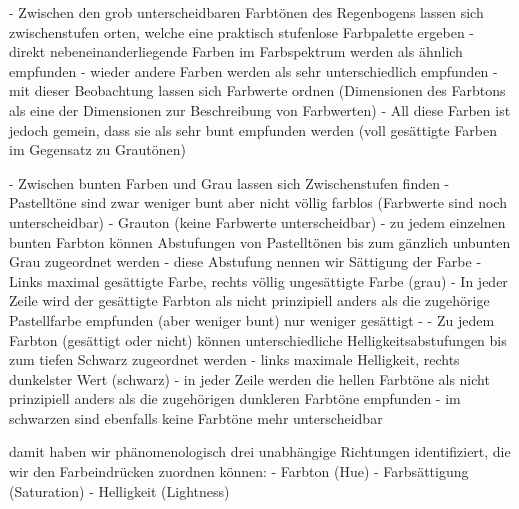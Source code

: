 \documentclass[10pt,landscape]{article}
\begin{document}
\begin{multicols}{3}
- Zwischen den grob unterscheidbaren Farbtönen des Regenbogens lassen sich zwischenstufen orten, welche eine praktisch stufenlose Farbpalette ergeben
- direkt nebeneinanderliegende Farben im Farbspektrum werden als ähnlich empfunden 
- wieder andere Farben werden als sehr unterschiedlich empfunden
- mit dieser Beobachtung lassen sich Farbwerte ordnen (Dimensionen des Farbtons als eine der Dimensionen zur Beschreibung von Farbwerten)
- All diese Farben ist jedoch gemein, dass sie als sehr bunt empfunden werden (voll gesättigte Farben im Gegensatz zu Grautönen)

- Zwischen bunten Farben und Grau lassen sich Zwischenstufen finden
- Pastelltöne sind zwar weniger bunt aber nicht völlig farblos (Farbwerte sind noch unterscheidbar)
- Grauton (keine Farbwerte unterscheidbar)
- zu jedem einzelnen bunten Farbton können Abstufungen von Pastelltönen bis zum gänzlich unbunten Grau zugeordnet werden
  - diese Abstufung nennen wir Sättigung der Farbe
  - Links maximal gesättigte Farbe, rechts völlig ungesättigte Farbe (grau)
- In jeder Zeile wird der gesättigte Farbton als nicht prinzipiell anders als die zugehörige Pastellfarbe empfunden (aber weniger bunt) nur weniger gesättigt
- 
- Zu jedem Farbton (gesättigt oder nicht) können unterschiedliche Helligkeitsabstufungen bis zum tiefen Schwarz zugeordnet werden
  - links maximale Helligkeit, rechts dunkelster Wert (schwarz)
  - in jeder Zeile werden die hellen Farbtöne als nicht prinzipiell anders als die zugehörigen dunkleren Farbtöne empfunden
  - im schwarzen sind ebenfalls keine Farbtöne mehr unterscheidbar

damit haben wir phänomenologisch drei unabhängige Richtungen identifiziert, die wir den Farbeindrücken zuordnen können:
- Farbton (Hue)
- Farbsättigung (Saturation)
- Helligkeit (Lightness)


\end{multicols}
\end{document}
